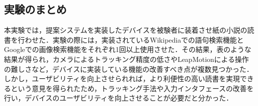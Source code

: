 \subsection{実験のまとめ}

本実験では，提案システムを実装したデバイスを被験者に装着させ紙の小説の読書を行わせた．実験の際には，実装されているWikipediaでの語句検索機能とGoogleでの画像検索機能をそれぞれ1回以上使用させた．その結果，表のような結果が得られ，カメラによるトラッキング精度の低さやLeapMotionによる操作の難しさなど，デバイスに実装している機能の改善すべき点が複数見つかった．しかし，ユーザビリティを向上させられれば，より利便性の高い読書を実現できるという意見を得られたため，トラッキング手法や入力インタフェースの改善を行い，デバイスのユーザビリティを向上させることが必要だと分かった．